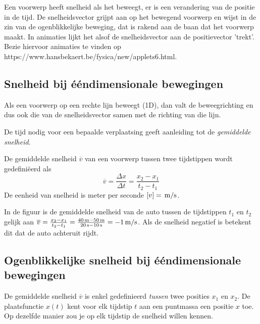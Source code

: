 \documentclass{ximera}
\begin{document}
	\author{Bart Lambregs,Vincent Gellens}
    \xmsource\xmuitleg

Een voorwerp heeft snelheid als het beweegt, er is een verandering van de positie in de tijd.
De snelheidsvector grijpt aan op het bewegend voorwerp en wijst in de zin van de ogenblikkelijke beweging, dat is rakend aan de baan dat het voorwerp maakt. %
In animaties lijkt het alsof de snelheidsvector aan de positievector 'trekt'. Bezie hiervoor animaties te vinden op https://www.hansbekaert.be/fysica/new/applets6.html.


\subsection*{Snelheid bij ééndimensionale bewegingen}


Als een voorwerp op een rechte lijn beweegt (1D), dan valt de beweegrichting en dus ook die van de snelheidsvector samen met de richting van die lijn. 

De tijd nodig voor een bepaalde verplaatsing geeft aanleiding tot de \textit{gemiddelde snelheid}. 


\begin{definition}
	
De gemiddelde snelheid $\overline{v}$ van een voorwerp tussen twee tijdstippen wordt gedefiniëerd als
\[
\overline{v}=\frac{\Delta x}{\Delta t}=\frac{x_2-x_1}{t_2-t_1}
\]
De eenheid van snelheid is meter per seconde $[v]=\rm\,m/s$. 
\end{definition}

In de figuur is de gemiddelde snelheid van de auto tussen de tijdstippen $t_1$ en $t_2$ gelijk aan $\overline{v}=\frac{x_2-x_1}{t_2-t_1}=\frac{40\rm\,m-50\rm\,m}{20\rm\,s-10\rm\,s}=-1\rm\,m/s$. Als de snelheid negatief is betekent dit dat de auto achteruit rijdt.



\subsection*{Ogenblikkelijke snelheid bij ééndimensionale bewegingen}

De gemiddelde snelheid \(\overline{v}\) is enkel gedefinieerd \textit{tussen} twee posities \(x_1\) en \(x_2\). De plaatsfunctie \(x(t)\) kent voor elk tijdstip \(t\) aan een puntmassa een positie \(x\) toe. Op dezelfde manier zou je op elk tijdstip de snelheid willen kennen. 
\end{document}
